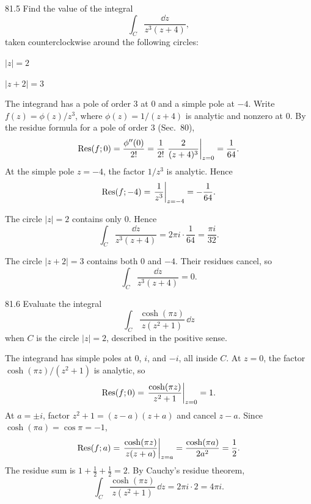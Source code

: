 \documentclass[11pt,oneside]{article}
\begin{document}
\begin{exercise}{81.5}
Find the value of the integral
\[
    \int_C\frac{\dd z}{z^3(z+4)},
\]
taken counterclockwise around the following circles:
\begin{exercisesubparts}
    \item $|z|=2$
    \item $|z+2|=3$
\end{exercisesubparts}
\end{exercise}

\begin{solution}
The integrand has a pole of order $3$ at $0$ and a simple pole at $-4$. Write $f(z)=\phi(z)/z^3$, where $\phi(z)=1/(z+4)$ is analytic and nonzero at $0$. By the residue formula for a pole of order $3$ (Sec.~80),
\[
    \operatorname{Res}(f; 0)=\frac{\phi''(0)}{2!}
    =\frac1{2!}\left.\frac2{(z+4)^3}\right|_{z=0}
    =\frac1{64}.
\]
At the simple pole $z=-4$, the factor $1/z^3$ is analytic. Hence
\[
    \operatorname{Res}(f; -4)=\left.\frac1{z^3}\right|_{z=-4}=-\frac1{64}.
\]
\begin{exercisesubparts}
    \item The circle $|z|=2$ contains only $0$. Hence
    \[
        \boxed{\int_C\frac{\dd z}{z^3(z+4)}
           =2\pi i\cdot\frac1{64}=\frac{\pi i}{32}.}
    \]

    \item The circle $|z+2|=3$ contains both $0$ and $-4$. Their residues cancel, so
    \[
        \boxed{\int_C\frac{\dd z}{z^3(z+4)}=0.}
    \]
\end{exercisesubparts}
\end{solution}

\begin{exercise}{81.6}
Evaluate the integral
\[
    \int_C\frac{\cosh(\pi z)}{z(z^2+1)}\,\dd z
\]
when $C$ is the circle $|z|=2$, described in the positive sense.
\end{exercise}

\begin{solution}
The integrand has simple poles at $0$, $i$, and $-i$, all inside $C$. At $z=0$, the factor $\cosh(\pi z)/(z^2+1)$ is analytic, so
\[
    \operatorname{Res}(f; 0)=\left.\frac{\cosh(\pi z)}{z^2+1}\right|_{z=0}=1.
\]
At $a=\pm i$, factor $z^2+1=(z-a)(z+a)$ and cancel $z-a$. Since
$\cosh(\pi a)=\cos\pi=-1$,
\[
    \operatorname{Res}(f; a)=\left.\frac{\cosh(\pi z)}{z(z+a)}\right|_{z=a}
    =\frac{\cosh(\pi a)}{2a^2}=\frac12.
\]
The residue sum is $1+\frac12+\frac12=2$. By Cauchy's residue theorem,
\[
    \boxed{\int_C\frac{\cosh(\pi z)}{z(z^2+1)}\,\dd z
       =2\pi i\cdot2=4\pi i.}
\]
\end{solution}
\end{document}
